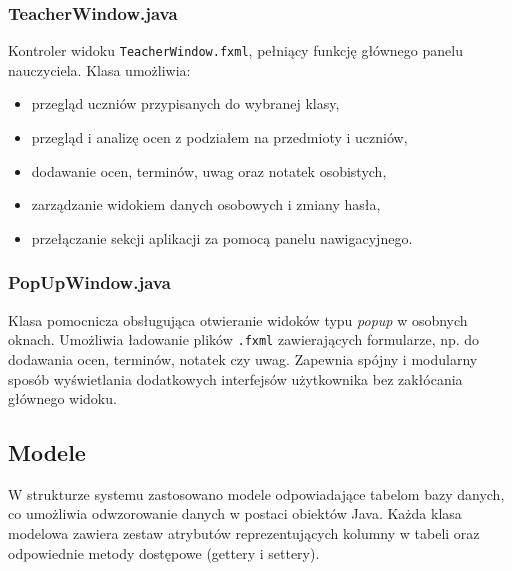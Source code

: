\subsubsection*{TeacherWindow.java}
Kontroler widoku \texttt{TeacherWindow.fxml}, pełniący funkcję głównego panelu nauczyciela. Klasa umożliwia:
\begin{itemize}
    \item przegląd uczniów przypisanych do wybranej klasy,
    \item przegląd i analizę ocen z podziałem na przedmioty i uczniów,
    \item dodawanie ocen, terminów, uwag oraz notatek osobistych,
    \item zarządzanie widokiem danych osobowych i zmiany hasła,
    \item przełączanie sekcji aplikacji za pomocą panelu nawigacyjnego.
\end{itemize}

\subsubsection*{PopUpWindow.java}
Klasa pomocnicza obsługująca otwieranie widoków typu \textit{popup} w osobnych oknach. Umożliwia ładowanie plików \texttt{.fxml} zawierających formularze, np. do dodawania ocen, terminów, notatek czy uwag. Zapewnia spójny i modularny sposób wyświetlania dodatkowych interfejsów użytkownika bez zakłócania głównego widoku.

\subsection{Modele}
\label{sec:moduly}

W strukturze systemu zastosowano modele odpowiadające tabelom bazy danych, co umożliwia odwzorowanie danych w postaci obiektów Java. Każda klasa modelowa zawiera zestaw atrybutów reprezentujących kolumny w tabeli oraz odpowiednie metody dostępowe (gettery i settery).

